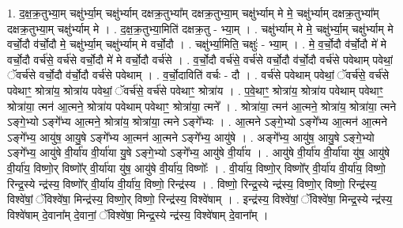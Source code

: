 \documentclass[17pt]{extarticle}
\begin{document}
1. द॒क्ष॒क्र॒तुभ्या॒म् चक्षु॑र्भ्या॒म् चक्षु॑र्भ्याम् दक्षक्र॒तुभ्या᳚म् दक्षक्र॒तुभ्या॒म् चक्षु॑र्भ्याम् मे मे॒ चक्षु॑र्भ्याम् दक्षक्र॒तुभ्या᳚म् दक्षक्र॒तुभ्या॒म् चक्षु॑र्भ्याम् मे । . द॒क्ष॒क्र॒तुभ्या॒मिति॑ दक्षक्र॒तु - भ्या॒म् । . चक्षु॑र्भ्याम् मे मे॒ चक्षु॑र्भ्या॒म् चक्षु॑र्भ्याम् मे वर्चो॒दौ व॑र्चो॒दौ मे॒ चक्षु॑र्भ्या॒म् चक्षु॑र्भ्याम् मे वर्चो॒दौ । . चक्षु॑र्भ्या॒मिति॒ चक्षुः॑ - भ्या॒म् । . मे॒ व॒र्चो॒दौ व॑र्चो॒दौ मे॑ मे वर्चो॒दौ वर्च॑से॒ वर्च॑से वर्चो॒दौ मे॑ मे वर्चो॒दौ वर्च॑से । . व॒र्चो॒दौ वर्च॑से॒ वर्च॑से वर्चो॒दौ व॑र्चो॒दौ वर्च॑से पवेथाम् पवेथां॒ ॅवर्च॑से वर्चो॒दौ व॑र्चो॒दौ वर्च॑से पवेथाम् । . व॒र्चो॒दाविति॑ वर्चः - दौ । . वर्च॑से पवेथाम् पवेथां॒ ॅवर्च॑से॒ वर्च॑से पवेथाꣳ॒॒ श्रोत्रा॑य॒ श्रोत्रा॑य पवेथां॒ ॅवर्च॑से॒ वर्च॑से पवेथाꣳ॒॒ श्रोत्रा॑य । . प॒वे॒थाꣳ॒॒ श्रोत्रा॑य॒ श्रोत्रा॑य पवेथाम् पवेथाꣳ॒॒ श्रोत्रा॑या॒ त्मन॑ आ॒त्मने॒ श्रोत्रा॑य पवेथाम् पवेथाꣳ॒॒ श्रोत्रा॑या॒ त्मने᳚ । . श्रोत्रा॑या॒ त्मन॑ आ॒त्मने॒ श्रोत्रा॑य॒ श्रोत्रा॑या॒ त्मने ऽङ्गे॒भ्यो ऽङ्गे᳚भ्य आ॒त्मने॒ श्रोत्रा॑य॒ श्रोत्रा॑या॒ त्मने ऽङ्गे᳚भ्यः । . आ॒त्मने ऽङ्गे॒भ्यो ऽङ्गे᳚भ्य आ॒त्मन॑ आ॒त्मने ऽङ्गे᳚भ्य॒ आयु॑ष॒ आयु॒षे ऽङ्गे᳚भ्य आ॒त्मन॑ आ॒त्मने ऽङ्गे᳚भ्य॒ आयु॑षे । . अङ्गे᳚भ्य॒ आयु॑ष॒ आयु॒षे ऽङ्गे॒भ्यो ऽङ्गे᳚भ्य॒ आयु॑षे वी॒र्या॑य वी॒र्या॑या यु॒षे ऽङ्गे॒भ्यो ऽङ्गे᳚भ्य॒ आयु॑षे वी॒र्या॑य । . आयु॑षे वी॒र्या॑य वी॒र्या॑या यु॑ष॒ आयु॑षे वी॒र्या॑य॒ विष्णो॒र् विष्णो᳚र् वी॒र्या॑या यु॑ष॒ आयु॑षे वी॒र्या॑य॒ विष्णोः᳚ । . वी॒र्या॑य॒ विष्णो॒र् विष्णो᳚र् वी॒र्या॑य वी॒र्या॑य॒ विष्णो॒ रिन्द्र॒स्ये न्द्र॑स्य॒ विष्णो᳚र् वी॒र्या॑य वी॒र्या॑य॒ विष्णो॒ रिन्द्र॑स्य । . विष्णो॒ रिन्द्र॒स्ये न्द्र॑स्य॒ विष्णो॒र् विष्णो॒ रिन्द्र॑स्य॒ विश्वे॑षां॒ ॅविश्वे॑षा॒ मिन्द्र॑स्य॒ विष्णो॒र् विष्णो॒ रिन्द्र॑स्य॒ विश्वे॑षाम् । . इन्द्र॑स्य॒ विश्वे॑षां॒ ॅविश्वे॑षा॒ मिन्द्र॒स्ये न्द्र॑स्य॒ विश्वे॑षाम् दे॒वाना᳚म् दे॒वानां॒ ॅविश्वे॑षा॒ मिन्द्र॒स्ये न्द्र॑स्य॒ विश्वे॑षाम् दे॒वाना᳚म् । \newline
\end{document}
